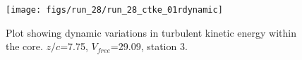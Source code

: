 \begin{figure}[H]
\centering
\texttt{[image: figs/run\_28/run\_28\_ctke\_01rdynamic]}
\caption{Plot showing dynamic variations in turbulent kinetic energy within the core. $z/c$=7.75, $V_{free}$=29.09, station 3.}
\label{fig:run_28_ctke_01rdynamic}
\end{figure}


